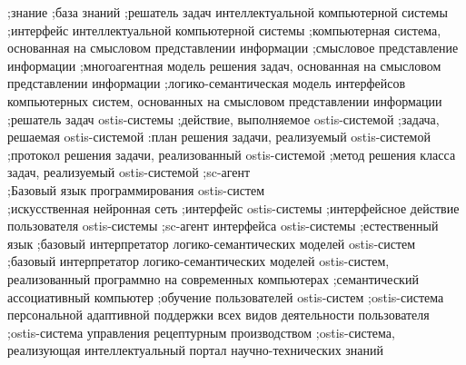 \begin{SCn}
{;знание
;база знаний
;решатель задач интеллектуальной компьютерной системы
;интерфейс интеллектуальной компьютерной системы
;компьютерная система, основанная на смысловом представлении информации
;смысловое представление информации
;многоагентная модель решения задач, основанная на смысловом представлении информации
;логико-семантическая модель интерфейсов компьютерных систем, основанных на смысловом представлении информации
;решатель задач ostis-системы
;действие, выполняемое ostis-системой
;задача, решаемая ostis-системой
:план решения задачи, реализуемый ostis-системой
;протокол решения задачи, реализованный ostis-системой
;метод решения класса задач, реализуемый ostis-системой
;sc-агент\\
;Базовый язык программирования ostis-систем\\
;искусственная нейронная сеть
;интерфейс ostis-системы
;интерфейсное действие пользователя ostis-системы
;sc-агент интерфейса ostis-системы
;естественный язык
;базовый интерпретатор логико-семантических моделей ostis-систем
;базовый интерпретатор логико-семантических моделей ostis-систем, реализованный программно на современных компьютерах
;семантический ассоциативный компьютер
;обучение пользователей ostis-систем
;ostis-система персональной адаптивной поддержки всех видов деятельности пользователя
;ostis-система управления рецептурным производством
;ostis-система, реализующая интеллектуальный портал научно-технических знаний}



\end{SCn}

